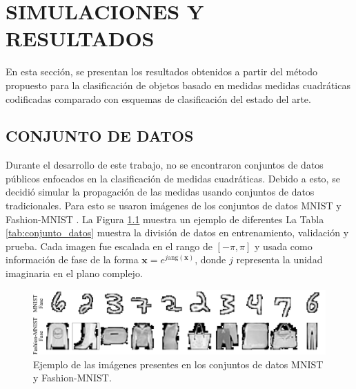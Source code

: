 
\chapter{SIMULACIONES Y RESULTADOS}

En esta sección, se presentan los resultados obtenidos a partir del método propuesto para la clasificación de objetos basado en medidas medidas cuadráticas codificadas comparado con esquemas de clasificación del estado del arte.

\section{CONJUNTO DE DATOS}

Durante el desarrollo de este trabajo, no se encontraron conjuntos de datos públicos enfocados en la clasificación de medidas cuadráticas. Debido a esto, se decidió simular la propagación de las medidas usando conjuntos de datos tradicionales. Para esto se usaron imágenes de los conjuntos de datos MNIST  y Fashion-MNIST . La Figura \ref{fig:conjunto_datos} muestra un ejemplo de diferentes La Tabla \ref{tab:conjunto_datos} muestra la división de datos en entrenamiento, validación y prueba. Cada imagen fue escalada en el rango de $[-\pi, \pi]$ y usada como información de fase de la forma $\mathbf{x}=e^{j\mathrm{ang}(\mathbf{x})}$, donde $j$ representa la unidad imaginaria en el plano complejo.

\begin{figure}[!h]
    \centering
    \includegraphics[width=\linewidth]{images/datasets.pdf}
    \caption{Ejemplo de las imágenes presentes en los conjuntos de datos MNIST y Fashion-MNIST.}
    \label{fig:conjunto_datos}
\end{figure}


